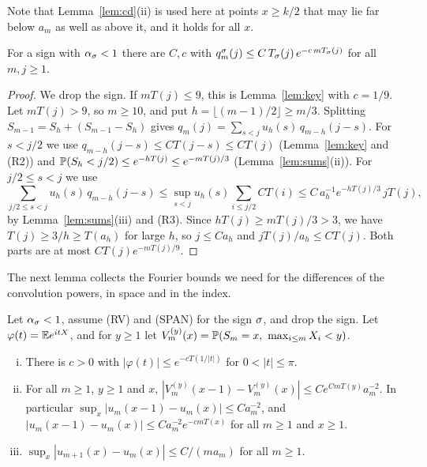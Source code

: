 Note that Lemma~\ref{lem:cd}(ii) is used here at points $x\ge k/2$ that may lie far
below $a_m$ as well as above it, and it holds for all $x$.

\begin{lemma}[decay in $m$]\label{lem:decay}
For a sign with $\alpha_\sigma<1$ there are $C,c$ with $q^\sigma_m(j)\le C\,T_\sigma(j)\,e^{-c\,mT_\sigma(j)}$ for
all $m,j\ge1$.
\end{lemma}

\begin{proof}
We drop the sign. If $mT(j)\le9$, this is Lemma~\ref{lem:key} with $c=1/9$. Let
$mT(j)>9$, so $m\ge10$, and put $h=\lfloor(m-1)/2\rfloor\ge m/3$. Splitting
$S_{m-1}=S_h+(S_{m-1}-S_h)$ gives $q_m(j)=\sum_{s<j}u_h(s)\,q_{m-h}(j-s)$. For $s<j/2$
we use $q_{m-h}(j-s)\le CT(j-s)\le CT(j)$ (Lemma~\ref{lem:key} and (R2)) and
$\mathbb{P}(S_h<j/2)\le e^{-hT(j)}\le e^{-mT(j)/3}$ (Lemma~\ref{lem:sums}(ii)). For
$j/2\le s<j$ we use
\[
 \sum_{j/2\le s<j}u_h(s)\,q_{m-h}(j-s)\le\sup_{s<j}u_h(s)\sum_{i\le j/2}CT(i)
 \le C\,a_h^{-1}e^{-hT(j)/3}\,jT(j),
\]
by Lemma~\ref{lem:sums}(iii) and (R3). Since $hT(j)\ge mT(j)/3>3$, we have
$T(j)\ge3/h\ge T(a_h)$ for large $h$, so $j\le Ca_h$ and $jT(j)/a_h\le CT(j)$. Both
parts are at most $CT(j)e^{-mT(j)/9}$.
\end{proof}

The next lemma collects the Fourier bounds we need for the differences of the convolution
powers, in space and in the index.

\begin{lemma}\label{lem:fourier}
Let $\alpha_\sigma<1$, assume (RV) and (SPAN) for the sign $\sigma$, and drop the sign. Let
$\varphi(t)=\mathbb{E} e^{itX}$, and for $y\ge1$ let $V^{(y)}_m(x)=\mathbb{P}(S_m=x,\ \max_{i\le m}X_i<y)$.
\begin{enumerate}[(i)]
\item There is $c>0$ with $|\varphi(t)|\le e^{-cT(1/|t|)}$ for $0<|t|\le\pi$.
\item For all $m\ge1$, $y\ge1$ and $x$, $|V^{(y)}_m(x-1)-V^{(y)}_m(x)|\le Ce^{CmT(y)}a_m^{-2}$. In
particular $\sup_x|u_m(x-1)-u_m(x)|\le Ca_m^{-2}$, and $|u_m(x-1)-u_m(x)|\le Ca_m^{-2}e^{-cmT(x)}$ for all
$m\ge1$ and $x\ge1$.
\item $\sup_x|u_{m+1}(x)-u_m(x)|\le C/(ma_m)$ for all $m\ge1$.
\end{enumerate}
\end{lemma}

